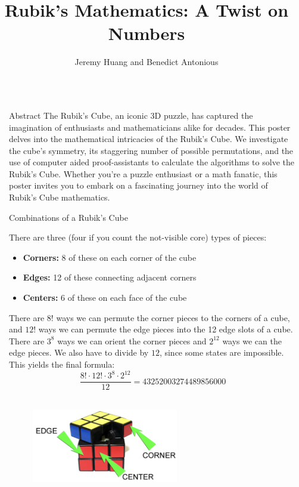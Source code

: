 \documentclass[final]{beamer}
\title{Rubik's Mathematics: A Twist on Numbers}
\author{Jeremy Huang and Benedict Antonious}
\institute[shortinst]{University of Colorado Boulder}
\newlength{\sepwidth}
\newlength{\colwidth}
\newcommand{\separatorcolumn}{\begin{column}{\sepwidth}\end{column}}
\begin{document}
\begin{frame}[t]
\begin{columns}[t]
\separatorcolumn

\begin{column}{\colwidth}

  \begin{block}{Abstract}
    \large The Rubik's Cube, an iconic 3D puzzle, has captured the imagination of enthusiasts and mathematicians alike for decades. This poster delves into the mathematical intricacies of the Rubik's Cube. We investigate the cube's symmetry, its staggering number of possible permutations, and the use of computer aided proof-assistants to calculate the algorithms to solve the Rubik's Cube. Whether you're a puzzle enthusiast or a math fanatic, this poster invites you to embark on a fascinating journey into the world of Rubik's Cube mathematics.


  \end{block}

  \begin{block}{Combinations of a Rubik's Cube}

    \large There are three (four if you count the not-visible core) types of pieces:

    \begin{itemize} %
      \item \textbf{Corners:} 8 of these on each corner of the cube
      \item \textbf{Edges:} 12 of these connecting adjacent corners
      \item \textbf{Centers:} 6 of these on each face of the cube
    \end{itemize}

    There are $8!$ ways we can permute the corner pieces to the corners of a cube, and $12!$ ways 
    we can permute the edge pieces into the 12 edge slots of a cube. There are $3^8$ ways we can orient 
    the corner pieces and $2^{12}$ ways we can the edge pieces. We also have to divide by $12$, 
    since some states are impossible. This yields the final formula: \\

    $$ \displaystyle\frac{8!\cdot 12! \cdot 3^8 \cdot 2^{12}}{12} = 43252003274489856000 $$ \\

    \begin{figure}
      \centering
                    \includegraphics[width=0.6\textwidth]{logos/rubikspieces.png}
    \end{figure}


\end{block}
\end{column}
\end{columns}
\end{frame}
\end{document}
